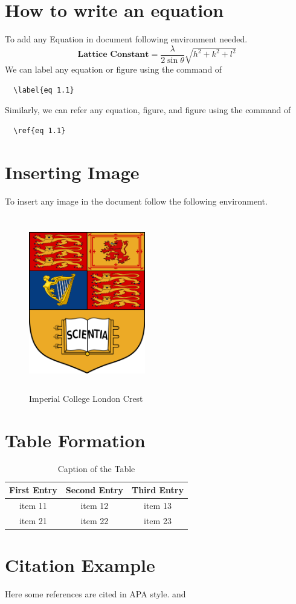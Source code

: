 \section{How to write an equation}
To add any Equation in document following environment needed.
\begin{equation}
    \textbf{Lattice Constant} =\frac{\lambda}{2\sin{\theta}}\sqrt{h^2+k^2+l^2}
    \label{eq 1.1}
\end{equation}
We can label any equation or figure using the command of  \begin{verbatim}
  \label{eq 1.1}
\end{verbatim}
Similarly, we can refer any equation, figure, and figure using the command of\begin{verbatim}
  \ref{eq 1.1}
\end{verbatim}


\section{Inserting Image}
To insert any image in the document follow the following environment.
\begin{figure}[hbt!]
    \centering
    \includegraphics[width=2in,height=3in]{images/icl_crest}
    \caption{Imperial College London Crest}
    \label{fig:my_label}
\end{figure}


\section{Table Formation}
\begin{table}[hbt!]
    \centering
    \caption{Caption of the Table}
    \begin{tabular}{ccc}
        \hline
        First Entry & Second Entry & Third Entry \\
        \hline
        item 11     & item 12      & item 13     \\
        item 21     & item 22      & item 23     \\
        \hline
    \end{tabular}
    \label{tab 1.1}
\end{table}


\section{Citation Example}
\hspace{4em}
Here some references are cited in APA style. \cite{vellacheri2014high} and \cite{asaithambi2021synthesis}
